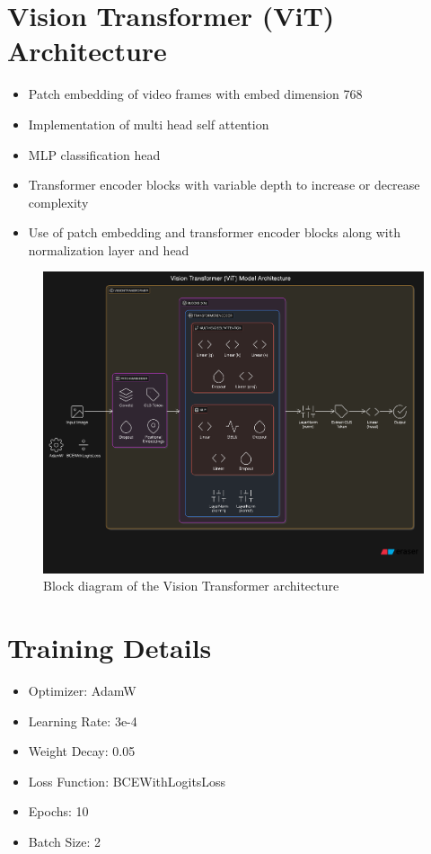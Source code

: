 \documentclass[11pt]{article}
\begin{document}
\section{Vision Transformer (ViT) Architecture}
\begin{itemize}
    \item Patch embedding of video frames with embed dimension 768
    \item Implementation of multi head self attention
    \item MLP classification head
    \item Transformer encoder blocks with variable depth to increase or decrease complexity
    \item Use of patch embedding and transformer encoder blocks along with normalization layer and head
\end{itemize}

\begin{figure}[h!]
    \centering
    \includegraphics[width=0.9\linewidth]{architecture.png}
    \caption{Block diagram of the Vision Transformer architecture}
    \label{fig:transformer_diagram}
\end{figure}

\pagebreak

\section{Training Details}
\begin{itemize}
    \item Optimizer: AdamW
    \item Learning Rate: 3e-4
    \item Weight Decay: 0.05
    \item Loss Function: BCEWithLogitsLoss
    \item Epochs: 10
    \item Batch Size: 2
\end{itemize}
\end{document}
